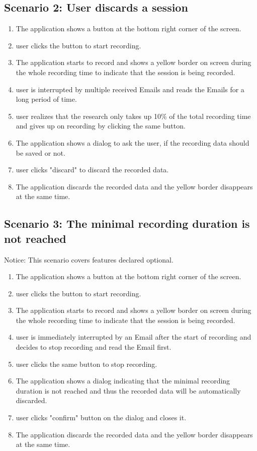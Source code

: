 \subsection{Scenario 2: User discards a session}
\begin{enumerate}
    \item The application shows a button at the bottom right corner of the screen.
    \item \Gls{user} clicks the button to start recording.
    \item The application starts to record and shows a yellow border on screen during the whole recording time to indicate that the \gls{session} is being recorded.
    \item \Gls{user} is interrupted by multiple received Emails and reads the Emails for a long period of time.
    \item \Gls{user} realizes that the research only takes up 10\% of the total recording time and gives up on recording by clicking the same button.
    \item The application shows a dialog to ask the \gls{user}, if the recording data should be saved or not.
    \item \Gls{user} clicks "discard" to discard the recorded data.
    \item The application discards the recorded data and the yellow border disappears at the same time.
\end{enumerate}

\subsection{Scenario 3: The minimal recording duration is not reached}
Notice: This scenario covers features declared optional.
\begin{enumerate}
    \item The application shows a button  at the bottom right corner of the screen.
    \item \Gls{user} clicks the button to start recording.
    \item The application starts to record and shows a yellow border on screen during the whole recording time to indicate that the \gls{session} is being recorded.
    \item \Gls{user} is immediately interrupted by an Email after the start of recording and decides to stop recording and read the Email first.
    \item \Gls{user} clicks the same button to stop recording.
    \item The application shows a dialog indicating that the minimal recording duration \see[OC10] is not reached and thus the recorded data will be automatically discarded.
    \item \Gls{user} clicks "confirm" button on the dialog and closes it.
    \item The application discards the recorded data and the yellow border disappears at the same time.
    \end{enumerate}
    
